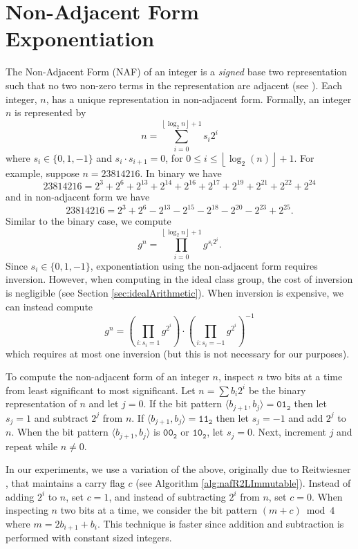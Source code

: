\documentclass{ucalgthes1}
\theoremstyle{definition}
\newcommand{\floor}[1]{\left\lfloor #1 \right\rfloor}
\newcommand{\binary}[1]{\texttt{#1}_\texttt{2}}
\begin{document}
\section{Non-Adjacent Form Exponentiation}
\label{sec:naf}

The Non-Adjacent Form (NAF) of an integer is a \emph{signed} base two representation such that no two non-zero terms in the representation are adjacent (see \cite[\S 9.1.4]{Cohen2006}).  Each integer, $n$, has a unique representation in non-adjacent form. Formally, an integer $n$ is represented by
\[
	n = \sum_{i=0}^{\floor{\log_2 n}+1} s_i 2^i
\]
where $s_i \in \{0, 1, -1\}$ and $s_i \cdot s_{i+1} = 0$, for $0 \le i \le \floor{\log_2(n)} + 1$.  For example, suppose $n = 23814216$.  In binary we have
\begin{equation}
\label{eq:binaryEg}
	23814216 = 2^3+2^6+2^{13}+2^{14}+2^{16}+2^{17}+2^{19}+2^{21}+2^{22}+2^{24}
\end{equation}
and in non-adjacent form we have
\begin{equation}
\label{eq:nafEg}
	23814216 = 2^3+2^6-2^{13}-2^{15}-2^{18}-2^{20}-2^{23}+2^{25}.
\end{equation}
Similar to the binary case, we compute
\begin{equation}
\label{eq:nafWithInv}
	g^n = \prod _{i=0}^{\floor{\log_2 n}+1} g^{s_i 2^i}.
\end{equation}
Since $s_i \in \{0, 1, -1\}$, exponentiation using the non-adjacent form requires inversion.  However, when computing in the ideal class group, the cost of inversion is negligible (see Section \ref{sec:idealArithmetic}).  When inversion is expensive, we can instead compute
\[
	g^n = \left( \prod_{i : s_i=1} g^{2^i} \right) \cdot \left( \prod_{i : s_i=-1} g^{2^i} \right)^{-1}
\]
which requires at most one inversion (but this is not necessary for our purposes).

To compute the non-adjacent form of an integer $n$, inspect $n$ two bits at a time from least significant to most significant.  Let $n=\sum b_i2^i$ be the binary representation of $n$ and let $j=0$.  If the bit pattern $\langle b_{j+1}, b_j \rangle = \binary{01}$ then let $s_j = 1$ and subtract $2^j$ from $n$.  If $\langle b_{j+1}, b_j \rangle = \binary{11}$ then let $s_j = -1$ and add $2^j$ to $n$.  When the bit pattern $\langle b_{j+1}, b_j \rangle$ is $\binary{00}$ or $\binary{10}$, let $s_j = 0$. Next, increment $j$ and repeat while $n \ne 0$.

In our experiments, we use a variation of the above, originally due to Reitwiesner \cite{reitwiesner1960}, that maintains a carry flag $c$ (see Algorithm \ref{alg:nafR2LImmutable}).  Instead of adding $2^i$ to $n$, set $c = 1$, and instead of subtracting $2^i$ from $n$, set $c = 0$.  When inspecting $n$ two bits at a time, we consider the bit pattern $(m+c) \bmod 4$ where $m = 2 b_{i+1} + b_i$.  This technique is faster since addition and subtraction is performed with constant sized integers.
\end{document}
